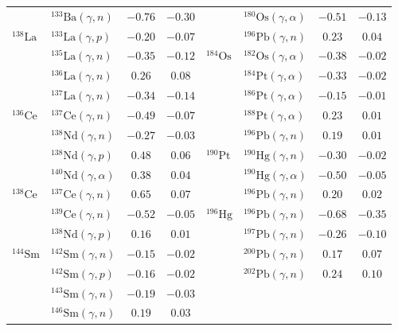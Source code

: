 \begin{table}
\begin{tabular}{llcc|llcc}
    $ $ & $^{133}\mathrm{Ba}(\gamma,n)$ & $-0.76$ & $-0.30$ & $ $ & $^{180}\mathrm{Os}(\gamma,\alpha)$ & $-0.51$ & $-0.13$ \\ 
    $^{138}\mathrm{La}$ & $^{133}\mathrm{La}(\gamma,p)$ & $-0.20$ & $-0.07$ & $ $ & $^{196}\mathrm{Pb}(\gamma,n)$ & $0.23$ & $0.04$ \\ 
    $ $ & $^{135}\mathrm{La}(\gamma,n)$ & $-0.35$ & $-0.12$ & $^{184}\mathrm{Os}$ & $^{182}\mathrm{Os}(\gamma,\alpha)$ & $-0.38$ & $-0.02$ \\ 
    $ $ & $^{136}\mathrm{La}(\gamma,n)$ & $0.26$ & $0.08$ & $ $ & $^{184}\mathrm{Pt}(\gamma,\alpha)$ & $-0.33$ & $-0.02$ \\ 
    $ $ & $^{137}\mathrm{La}(\gamma,n)$ & $-0.34$ & $-0.14$ & $ $ & $^{186}\mathrm{Pt}(\gamma,\alpha)$ & $-0.15$ & $-0.01$ \\ 
    $^{136}\mathrm{Ce}$ & $^{137}\mathrm{Ce}(\gamma,n)$ & $-0.49$ & $-0.07$ & $ $ & $^{188}\mathrm{Pt}(\gamma,\alpha)$ & $0.23$ & $0.01$ \\ 
    $ $ & $^{138}\mathrm{Nd}(\gamma,n)$ & $-0.27$ & $-0.03$ & $ $ & $^{196}\mathrm{Pb}(\gamma,n)$ & $0.19$ & $0.01$ \\ 
    $ $ & $^{138}\mathrm{Nd}(\gamma,p)$ & $0.48$ & $0.06$ & $^{190}\mathrm{Pt}$ & $^{190}\mathrm{Hg}(\gamma,n)$ & $-0.30$ & $-0.02$ \\ 
    $ $ & $^{140}\mathrm{Nd}(\gamma,\alpha)$ & $0.38$ & $0.04$ & $ $ & $^{190}\mathrm{Hg}(\gamma,\alpha)$ & $-0.50$ & $-0.05$ \\ 
    $^{138}\mathrm{Ce}$ & $^{137}\mathrm{Ce}(\gamma,n)$ & $0.65$ & $0.07$ & $ $ & $^{196}\mathrm{Pb}(\gamma,n)$ & $0.20$ & $0.02$ \\ 
    $ $ & $^{139}\mathrm{Ce}(\gamma,n)$ & $-0.52$ & $-0.05$ & $^{196}\mathrm{Hg}$ & $^{196}\mathrm{Pb}(\gamma,n)$ & $-0.68$ & $-0.35$ \\ 
    $ $ & $^{138}\mathrm{Nd}(\gamma,p)$ & $0.16$ & $0.01$ & $ $ & $^{197}\mathrm{Pb}(\gamma,n)$ & $-0.26$ & $-0.10$ \\ 
    $^{144}\mathrm{Sm}$ & $^{142}\mathrm{Sm}(\gamma,n)$ & $-0.15$ & $-0.02$ & $ $ & $^{200}\mathrm{Pb}(\gamma,n)$ & $0.17$ & $0.07$ \\ 
    $ $ & $^{142}\mathrm{Sm}(\gamma,p)$ & $-0.16$ & $-0.02$ & $ $ & $^{202}\mathrm{Pb}(\gamma,n)$ & $0.24$ & $0.10$ \\ 
    $ $ & $^{143}\mathrm{Sm}(\gamma,n)$ & $-0.19$ & $-0.03$ & $ $ & $ $ &  &  \\ 
    $ $ & $^{146}\mathrm{Sm}(\gamma,n)$ & $0.19$ & $0.03$ & $ $ & $ $ &  &  \\ 

\end{tabular}
\end{table}
